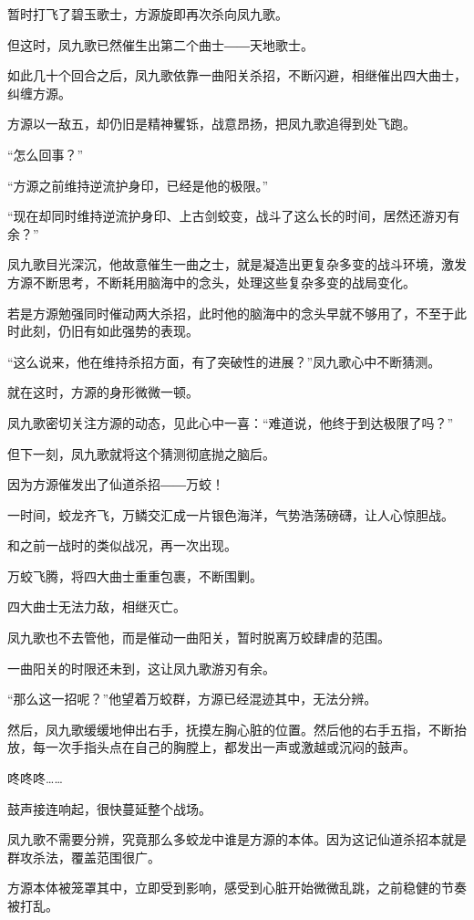 \begin{this_body}
暂时打飞了碧玉歌士，方源旋即再次杀向凤九歌。

但这时，凤九歌已然催生出第二个曲士――天地歌士。

如此几十个回合之后，凤九歌依靠一曲阳关杀招，不断闪避，相继催出四大曲士，纠缠方源。

方源以一敌五，却仍旧是精神矍铄，战意昂扬，把凤九歌追得到处飞跑。

“怎么回事？”

“方源之前维持逆流护身印，已经是他的极限。”

“现在却同时维持逆流护身印、上古剑蛟变，战斗了这么长的时间，居然还游刃有余？”

凤九歌目光深沉，他故意催生一曲之士，就是凝造出更复杂多变的战斗环境，激发方源不断思考，不断耗用脑海中的念头，处理这些复杂多变的战局变化。

若是方源勉强同时催动两大杀招，此时他的脑海中的念头早就不够用了，不至于此时此刻，仍旧有如此强势的表现。

“这么说来，他在维持杀招方面，有了突破性的进展？”凤九歌心中不断猜测。

就在这时，方源的身形微微一顿。

凤九歌密切关注方源的动态，见此心中一喜：“难道说，他终于到达极限了吗？”

但下一刻，凤九歌就将这个猜测彻底抛之脑后。

因为方源催发出了仙道杀招――万蛟！

一时间，蛟龙齐飞，万鳞交汇成一片银色海洋，气势浩荡磅礴，让人心惊胆战。

和之前一战时的类似战况，再一次出现。

万蛟飞腾，将四大曲士重重包裹，不断围剿。

四大曲士无法力敌，相继灭亡。

凤九歌也不去管他，而是催动一曲阳关，暂时脱离万蛟肆虐的范围。

一曲阳关的时限还未到，这让凤九歌游刃有余。

“那么这一招呢？”他望着万蛟群，方源已经混迹其中，无法分辨。

然后，凤九歌缓缓地伸出右手，抚摸左胸心脏的位置。然后他的右手五指，不断抬放，每一次手指头点在自己的胸膛上，都发出一声或激越或沉闷的鼓声。

咚咚咚……

鼓声接连响起，很快蔓延整个战场。

凤九歌不需要分辨，究竟那么多蛟龙中谁是方源的本体。因为这记仙道杀招本就是群攻杀法，覆盖范围很广。

方源本体被笼罩其中，立即受到影响，感受到心脏开始微微乱跳，之前稳健的节奏被打乱。


\end{this_body}

